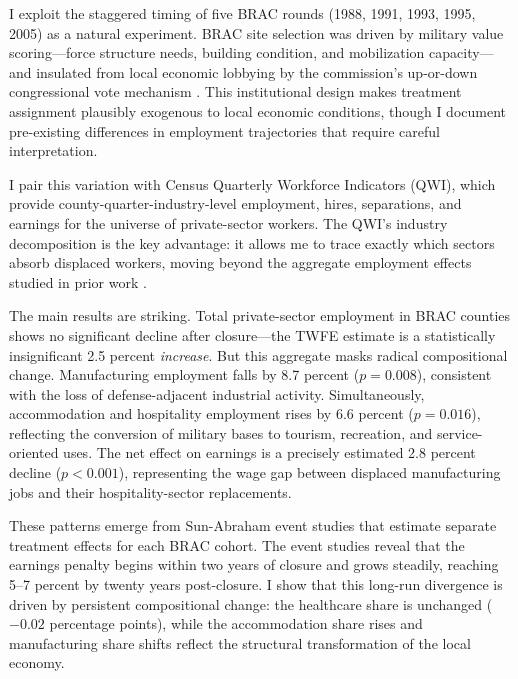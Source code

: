 \documentclass[12pt]{article}
\begin{document}
I exploit the staggered timing of five BRAC rounds (1988, 1991, 1993, 1995, 2005) as a natural experiment. BRAC site selection was driven by military value scoring---force structure needs, building condition, and mobilization capacity---and insulated from local economic lobbying by the commission's up-or-down congressional vote mechanism \citep{sorenson2007}. This institutional design makes treatment assignment plausibly exogenous to local economic conditions, though I document pre-existing differences in employment trajectories that require careful interpretation.

I pair this variation with Census Quarterly Workforce Indicators (QWI), which provide county-quarter-industry-level employment, hires, separations, and earnings for the universe of private-sector workers. The QWI's industry decomposition is the key advantage: it allows me to trace exactly which sectors absorb displaced workers, moving beyond the aggregate employment effects studied in prior work \citep{hooker2001}.

The main results are striking. Total private-sector employment in BRAC counties shows no significant decline after closure---the TWFE estimate is a statistically insignificant 2.5 percent \textit{increase}. But this aggregate masks radical compositional change. Manufacturing employment falls by 8.7 percent ($p = 0.008$), consistent with the loss of defense-adjacent industrial activity. Simultaneously, accommodation and hospitality employment rises by 6.6 percent ($p = 0.016$), reflecting the conversion of military bases to tourism, recreation, and service-oriented uses. The net effect on earnings is a precisely estimated 2.8 percent decline ($p < 0.001$), representing the wage gap between displaced manufacturing jobs and their hospitality-sector replacements.

These patterns emerge from Sun-Abraham event studies that estimate separate treatment effects for each BRAC cohort. The event studies reveal that the earnings penalty begins within two years of closure and grows steadily, reaching 5--7 percent by twenty years post-closure. I show that this long-run divergence is driven by persistent compositional change: the healthcare share is unchanged ($-0.02$ percentage points), while the accommodation share rises and manufacturing share shifts reflect the structural transformation of the local economy.
\end{document}
